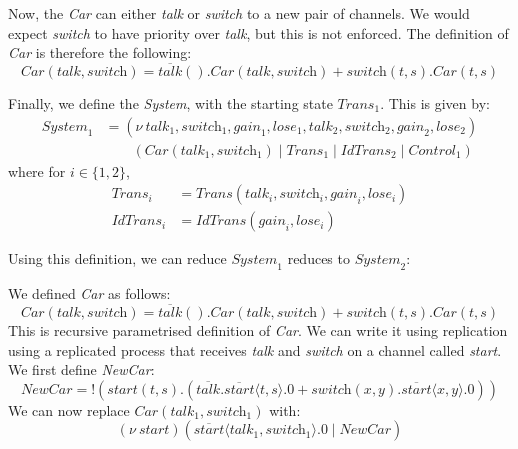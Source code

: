 \documentclass[a4paper, openany]{memoir}
\theoremstyle{definition}
\begin{document}
    Now, the \textit{Car} can either \textit{talk} or \textit{switch} to a new pair of channels. We would expect \textit{switch} to have priority over \textit{talk}, but this is not enforced. The definition of \textit{Car} is therefore the following:
    \[\textit{Car}(\textit{talk}, \textit{switch}) = \overline{\textit{talk}}().\textit{Car} (\textit{talk}, \textit{switch}) + \textit{switch} (t, s).\textit{Car}(t, s)\]

    Finally, we define the \textit{System}, with the starting state $\textit{Trans}_1$. This is given by:
    \begin{align*}
        \textit{System}_1 &= (\nu \ \textit{talk}_1, \textit{switch}_1, \textit{gain}_1, \textit{lose}_1, \textit{talk}_2, \textit{switch}_2, \textit{gain}_2, \textit{lose}_2) \\
        &\qquad (\textit{Car}(\textit{talk}_1, \textit{switch}_1) \mid \textit{Trans}_1 \mid \textit{IdTrans}_2 \mid \textit{Control}_1)
    \end{align*}
    where for $i \in \{1, 2\}$,
    \begin{align*}
        \textit{Trans}_i &= \textit{Trans}(\textit{talk}_i, \textit{switch}_i, \textit{gain}_i, \textit{lose}_i) \\
        \textit{IdTrans}_i &= \textit{IdTrans}(\textit{gain}_i, \textit{lose}_i) 
    \end{align*}

    Using this definition, we can reduce $\textit{System}_1$ reduces to $\textit{System}_2$:


    We defined \textit{Car} as follows:
    \[\textit{Car}(\textit{talk}, \textit{switch}) = \overline{\textit{talk}}().\textit{Car} (\textit{talk}, \textit{switch}) + \textit{switch} (t, s).\textit{Car}(t, s)\]
    This is recursive parametrised definition of \textit{Car}. We can write it using replication using a replicated process that receives \textit{talk} and \textit{switch} on a channel called \textit{start}. We first define \textit{NewCar}:
    \[\textit{NewCar} = !(\textit{start}(t, s).(
        \overline{\textit{talk}}.\overline{\textit{start}}\langle t, s \rangle.0 + 
        \textit{switch}(x, y).\overline{start} \langle x, y \rangle.0
    ))\]
    We can now replace $\textit{Car}(\textit{talk}_1, \textit{switch}_1)$ with:
    \[(\nu \ \textit{start})(\overline{\textit{start}} \langle \textit{talk}_1, \textit{switch}_1 \rangle.0 \mid \textit{NewCar})\]
\end{document}
